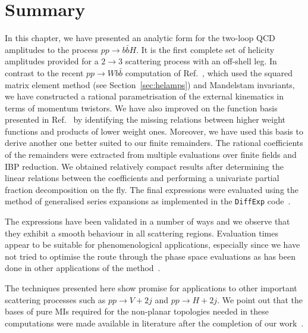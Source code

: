 \documentclass[main.tex]{subfiles}
\begin{document}
\section{Summary}
\label{Hbbsec:conclusions}


In this chapter, we have presented an analytic form for the two-loop QCD amplitudes to the process
$pp\to b\bar{b}H$. It is the first complete set of helicity
amplitudes provided for a $2\to 3$ scattering process with an off-shell leg. In contrast to the recent $pp\to Wb\bar{b}$ computation of Ref.~\cite{Badger:2021nhg}, which used the squared matrix element method (see Section~\ref{sec:helamps}) and Mandelstam invariants, we have constructed a rational parametrisation of the external kinematics in terms of momentum twistors. We have also improved on the function basis presented in Ref.~\cite{Badger:2021nhg} by identifying the missing relations between higher weight functions and products of lower weight ones. Moreover, we have used this basis to derive another one better suited to our finite remainders. The rational coefficients of the remainders were extracted from multiple evaluations over finite fields and IBP reduction. We obtained relatively compact results after determining the linear relations between the coefficients and performing a univariate partial fraction decomposition on the fly. The final expressions were evaluated using the method of generalised series expansions as implemented in the \texttt{DiffExp} code~\cite{Hidding:2020ytt}.

The expressions have been validated in a number of ways and we observe that they exhibit a smooth behaviour in all
scattering regions. Evaluation times appear to be suitable for phenomenological applications,
especially since we have not tried to optimise the route through the phase space evaluations as has
been done in other applications of the method~\cite{Frellesvig:2019byn,Abreu:2020jxa,Becchetti:2020wof,Bonciani:2021zzf,abreu2021twoloop}.

The techniques presented here show promise for applications to other important scattering processes such as $pp\to V+2j$ and $pp\to H+2j$. We point out that the bases of pure MIs required for the non-planar topologies needed in these computations were made available in literature after the completion of our work~\cite{Abreu:2023rco}.
\end{document}
